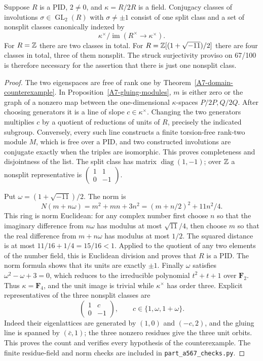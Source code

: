 \begin{proposition}\label{A7-PID-count}
Suppose $R$ is a PID, $2\ne0$, and $\kappa=R/2R$ is a field. Conjugacy classes of involutions $\sigma\in\operatorname{GL}_2(R)$ with $\sigma\ne\pm1$ consist of one split class and a set of nonsplit classes canonically indexed by
\[
 \kappa^\times/\operatorname{im}(R^\times\to\kappa^\times).
\]
For $R={\mathbb{Z}}$ there are two classes in total. For
$R={\mathbb{Z}}[(1+\sqrt{-11})/2]$ there are four classes in total, three of them nonsplit. The struck surjectivity proviso on 67/100 is therefore necessary for the assertion that there is just one nonsplit class.
\end{proposition}
\begin{proof}
The two eigenspaces are free of rank one by Theorem~\ref{A7-domain-counterexample}. In Proposition~\ref{A7-gluing-modules}, $m$ is either zero or the graph of a nonzero map between the one-dimensional $\kappa$-spaces $P/2P,Q/2Q$. After choosing generators it is a line of slope $c\in\kappa^\times$. Changing the two generators multiplies $c$ by a quotient of reductions of units of $R$, precisely the indicated subgroup. Conversely, every such line constructs a finite torsion-free rank-two module $M$, which is free over a PID, and two constructed involutions are conjugate exactly when the triples are isomorphic. This proves completeness and disjointness of the list. The split class has matrix $\operatorname{diag}(1,-1)$; over ${\mathbb{Z}}$ a nonsplit representative is $\left(\begin{smallmatrix}1&1\\0&-1\end{smallmatrix}\right)$.

Put $\omega=(1+\sqrt{-11})/2$. The norm is
\[
 N(m+n\omega)=m^2+mn+3n^2=(m+n/2)^2+11n^2/4.
\]
This ring is norm Euclidean: for any complex number first choose $n$ so that the imaginary difference from $n\omega$ has modulus at most $\sqrt{11}/4$, then choose $m$ so that the real difference from $m+n\omega$ has modulus at most $1/2$. The squared distance is at most $11/16+1/4=15/16<1$. Applied to the quotient of any two elements of the number field, this is Euclidean division and proves that $R$ is a PID. The norm formula shows that its units are exactly $\pm1$. Finally $\omega$ satisfies $\omega^2-\omega+3=0$, which reduces to the irreducible polynomial $t^2+t+1$ over $\mathbf F_2$. Thus $\kappa=\mathbf F_4$, and the unit image is trivial while $\kappa^\times$ has order three. Explicit representatives of the three nonsplit classes are
\[
 \begin{pmatrix}1&c\\0&-1\end{pmatrix},
 \qquad c\in\{1,\omega,1+\omega\}.
\]
Indeed their eigenlattices are generated by $(1,0)$ and $(-c,2)$, and the gluing line is spanned by $(\bar{c},1)$; the three nonzero residues give the three unit orbits. This proves the count and verifies every hypothesis of the counterexample. The finite residue-field and norm checks are included in \texttt{part\_a567\_checks.py}.
\end{proof}

